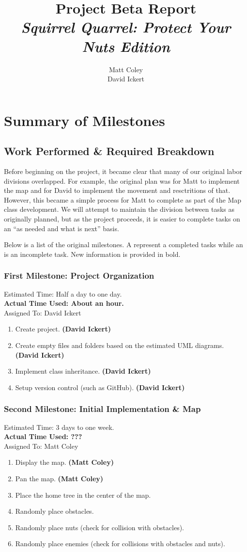 \documentclass[]{article}
\title{Project Beta Report\\\textit{Squirrel Quarrel: Protect Your Nuts Edition}}
\author{Matt Coley\\David Ickert\\}
\newcommand*\good{\item[\Checkmark]}
\newcommand*\bad{\item[\XSolidBrush]}
\begin{document}
	\maketitle
	\newpage
	\tableofcontents
	\newpage
	\section{Summary of Milestones}
	\subsection{Work Performed \& Required Breakdown}
		Before beginning on the project, it became clear that many of our original labor divisions overlapped.  For example, the original plan was for Matt to implement the map and for David to implement the movement and resctritions of that.  However, this became a simple process for Matt to complete as part of the Map class development.  We will attempt to maintain the division between tasks as originally planned, but as the project proceeds, it is easier to complete tasks on an ``as needed and what is next'' basis.
		
		Below is a list of the original milestones.  A \Checkmark represent a completed tasks while an \XSolidBrush is an incomplete task.  New information is provided in bold.
		\subsubsection{First Milestone: Project Organization}
		Estimated Time: Half a day to one day.\\
		\textbf{Actual Time Used: About an hour.}\\
		Assigned To: David Ickert
		\begin{enumerate}
			\good Create project. \textbf{(David Ickert)}
			\good Create empty files and folders based on the estimated UML diagrams. \textbf{(David Ickert)}
			\good Implement class inheritance. \textbf{(David Ickert)}
			\good Setup version control (such as GitHub). \textbf{(David Ickert)}
		\end{enumerate}		
		\subsubsection{Second Milestone: Initial Implementation \& Map}
		Estimated Time: 3 days to one week.\\
		\textbf{Actual Time Used: ???}\\		
		Assigned To: Matt Coley 
		\begin{enumerate}
			\good Display the map. \textbf{(Matt Coley)}
			\good Pan the map. \textbf{(Matt Coley)}
			\bad Place the home tree in the center of the map.
			\bad Randomly place obstacles.
			\bad Randomly place nuts (check for collision with obstacles).
			\bad Randomly place enemies (check for collisions with obstacles and nuts).
		\end{enumerate}	
\end{document}
